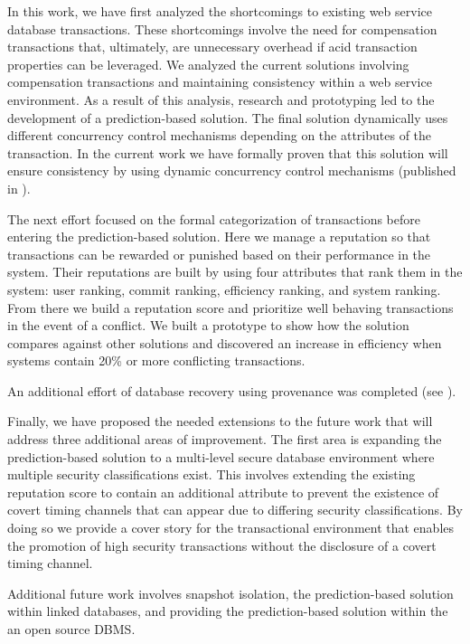 In this work, we have first analyzed the shortcomings to existing web service database transactions. These shortcomings involve the need for compensation transactions that, ultimately, are unnecessary overhead if \gls{acid} transaction properties can be leveraged. We analyzed the current solutions involving compensation transactions and maintaining consistency within a web service environment. As a result of this analysis, research and prototyping led to the development of a prediction-based solution. The final solution dynamically uses different concurrency control mechanisms depending on the attributes of the transaction. In the current work we have formally proven that this solution will ensure consistency by using dynamic concurrency control mechanisms (published in \cite{ravan_ensuring_2020}).

The next effort focused on the formal categorization of transactions before entering the prediction-based solution. Here we manage a reputation so that transactions can be rewarded or punished based on their performance in the system. Their reputations are built by using four attributes that rank them in the system: user ranking, commit ranking, efficiency ranking, and system ranking. From there we build a reputation score and prioritize well behaving transactions in the event of a conflict. We built a prototype to show how the solution compares against other solutions and discovered an increase in efficiency when systems contain 20\% or more conflicting transactions.

An additional effort of database recovery using provenance was completed (see \cite{theppatorn_2021}). 

Finally, we have proposed the needed extensions to the future work that will address three additional areas of improvement. The first area is expanding the prediction-based solution to a multi-level secure database environment where multiple security classifications exist. This involves extending the existing reputation score to contain an additional attribute to prevent the existence of covert timing channels that can appear due to differing security classifications. By doing so we provide a cover story for the transactional environment that enables the promotion of high security transactions without the disclosure of a covert timing channel.

Additional future work involves snapshot isolation, the prediction-based solution within linked databases, and providing the prediction-based solution within the an open source DBMS.


